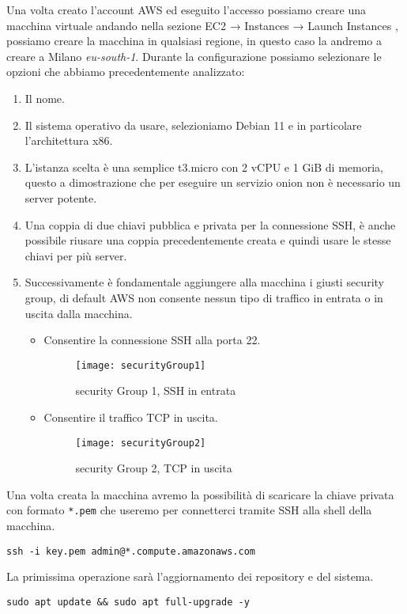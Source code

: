 Una volta creato l'account AWS ed eseguito l'accesso possiamo creare una macchina virtuale andando nella sezione EC2 → Instances → Launch Instances \cite{AwsLaunchInstance}, possiamo creare la macchina in qualsiasi regione, in questo caso la andremo a creare a Milano \emph{eu-south-1}. Durante la configurazione possiamo selezionare le opzioni che abbiamo precedentemente analizzato:
\begin{enumerate}
    \item Il nome.
    \item Il sistema operativo da usare, selezioniamo Debian 11 e in particolare l'architettura x86.
    \item L'istanza scelta è una semplice t3.micro con 2 vCPU e 1 GiB di memoria, questo a dimostrazione che per eseguire un servizio onion non è necessario un server potente.
    \item Una coppia di due chiavi pubblica e privata per la connessione SSH, è anche possibile riusare una coppia precedentemente creata e quindi usare le stesse chiavi per più server.
    \item Successivamente è fondamentale aggiungere alla macchina i giusti security group, di default AWS non consente nessun tipo di traffico in entrata o in uscita dalla macchina.
    \begin{itemize}
        \item Consentire la connessione SSH alla porta 22.
        \begin{figure}[h]
            \centering
            \texttt{[image: securityGroup1]}
            \caption{security Group 1,  SSH in entrata}
            \label{fig:sec1}
        \end{figure}
        
        \item Consentire il traffico TCP in uscita.
        \begin{figure}[h]
            \centering
            \texttt{[image: securityGroup2]}
            \caption{security Group 2, TCP in uscita}
            \label{fig:sec2}
        \end{figure}
    \end{itemize}
\end{enumerate}



Una volta creata la macchina avremo la possibilità di scaricare la chiave privata con formato \lstinline{*.pem} che useremo per connetterci tramite SSH alla shell della macchina.
\begin{lstlisting}[caption={Connessione SSH}]
    ssh -i key.pem admin@*.compute.amazonaws.com
\end{lstlisting}
La primissima operazione sarà l'aggiornamento dei repository e del sistema.
\begin{lstlisting}[caption={Aggiornamento del sistema}]
    sudo apt update && sudo apt full-upgrade -y
\end{lstlisting}

